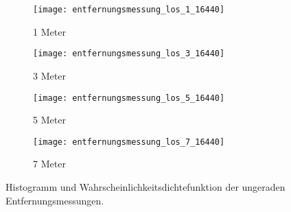 \begin{figure}[h!]
	\centering
	\begin{subfigure}[b]{0.45\textwidth}
		\centering
		\texttt{[image: entfernungsmessung\_los\_1\_16440]}
		\caption{1 Meter}
		\label{fig:entfernungsmessung_los_1_16440}
	\end{subfigure}
	\hfill
	\begin{subfigure}[b]{0.45\textwidth}
		\centering
		\texttt{[image: entfernungsmessung\_los\_3\_16440]}
		\caption{3 Meter}
		\label{fig:entfernungsmessung_los_3_16440}
	\end{subfigure}
	\bigskip
	\begin{subfigure}[b]{0.45\textwidth}
		\centering
		\texttt{[image: entfernungsmessung\_los\_5\_16440]}
		\caption{5 Meter}
		\label{fig:entfernungsmessung_los_5_16440}
	\end{subfigure}
	\hfil
	\begin{subfigure}[b]{0.45\textwidth}
		\centering
		\texttt{[image: entfernungsmessung\_los\_7\_16440]}
		\caption{7 Meter}
		\label{fig:entfernungsmessung_los_7_16440}
	\end{subfigure}
	\caption{Histogramm und Wahrscheinlichkeitsdichtefunktion der ungeraden Entfernungsmessungen.}
	\label{fig:entfernungsmessung_los_16440}
\end{figure}


